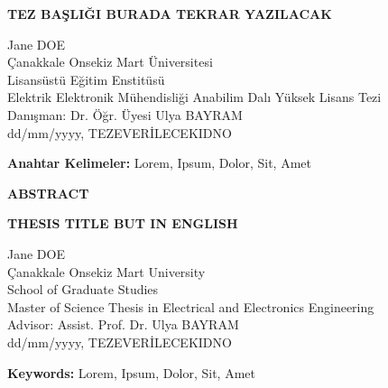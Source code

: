\documentclass[12pt]{report}
\begin{document}
\vspace{\baselineskip}

{\centering
\textbf{TEZ BAŞLIĞI BURADA TEKRAR YAZILACAK}\par
}

\vspace{\baselineskip}

{\centering
{Jane DOE}\\
{Çanakkale Onsekiz Mart Üniversitesi}\\
{Lisansüstü Eğitim Enstitüsü}\\
{Elektrik Elektronik Mühendisliği Anabilim Dalı Yüksek Lisans Tezi}\\
{Danışman: Dr. Öğr. Üyesi Ulya BAYRAM}\\
{dd/mm/yyyy, TEZEVERİLECEKIDNO}\par
}

\vspace{\baselineskip}

\lipsum[1-2]


\textbf{Anahtar Kelimeler:} Lorem, Ipsum, Dolor, Sit, Amet

\vfill


\newpage
\centerline{\normalsize\bfseries ABSTRACT}


\vspace{\baselineskip}

{\centering
\textbf{THESIS TITLE BUT IN ENGLISH}\par
}

\vspace{\baselineskip}

{\centering
{Jane DOE}\\
{Çanakkale Onsekiz Mart University}\\
{School of Graduate Studies}\\
{Master of Science Thesis in Electrical and Electronics Engineering}\\
{Advisor: Assist. Prof. Dr. Ulya BAYRAM}\\
{dd/mm/yyyy, TEZEVERİLECEKIDNO}\par
}

\vspace{\baselineskip}

\lipsum[1-2]


\textbf{Keywords:} Lorem, Ipsum, Dolor, Sit, Amet


\newpage
{}
\end{document}
